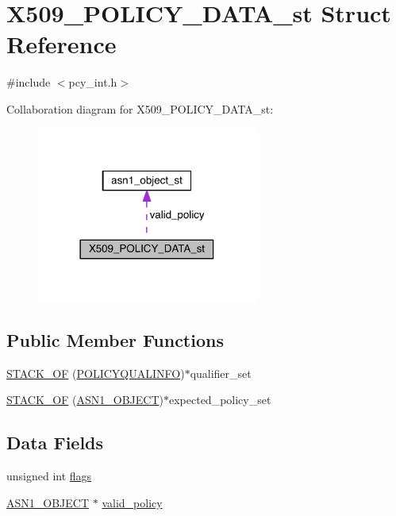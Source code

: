 \hypertarget{struct_x509___p_o_l_i_c_y___d_a_t_a__st}{}\section{X509\+\_\+\+P\+O\+L\+I\+C\+Y\+\_\+\+D\+A\+T\+A\+\_\+st Struct Reference}
\label{struct_x509___p_o_l_i_c_y___d_a_t_a__st}


{\ttfamily \#include $<$pcy\+\_\+int.\+h$>$}



Collaboration diagram for X509\+\_\+\+P\+O\+L\+I\+C\+Y\+\_\+\+D\+A\+T\+A\+\_\+st\+:\nopagebreak
\begin{figure}[H]
\begin{center}
\leavevmode
\includegraphics[width=206pt]{struct_x509___p_o_l_i_c_y___d_a_t_a__st__coll__graph}
\end{center}
\end{figure}
\subsection*{Public Member Functions}
\begin{DoxyCompactItemize}
\item 
\hyperlink{struct_x509___p_o_l_i_c_y___d_a_t_a__st_a58ec43f0c9b94dc50fed2e4c29132810}{S\+T\+A\+C\+K\+\_\+\+OF} (\hyperlink{crypto_2x509v3_2x509v3_8h_a2f82c96293f325f0a4f9899e4c0e8426}{P\+O\+L\+I\+C\+Y\+Q\+U\+A\+L\+I\+N\+FO})$\ast$qualifier\+\_\+set
\item 
\hyperlink{struct_x509___p_o_l_i_c_y___d_a_t_a__st_a8b6e20dfe686b546b146028a0f3c114a}{S\+T\+A\+C\+K\+\_\+\+OF} (\hyperlink{crypto_2ossl__typ_8h_ae3fda0801e4c8e250087052bafb3ce2e}{A\+S\+N1\+\_\+\+O\+B\+J\+E\+CT})$\ast$expected\+\_\+policy\+\_\+set
\end{DoxyCompactItemize}
\subsection*{Data Fields}
\begin{DoxyCompactItemize}
\item 
unsigned int \hyperlink{struct_x509___p_o_l_i_c_y___d_a_t_a__st_ac92588540e8c1d014a08cd8a45462b19}{flags}
\item 
\hyperlink{crypto_2ossl__typ_8h_ae3fda0801e4c8e250087052bafb3ce2e}{A\+S\+N1\+\_\+\+O\+B\+J\+E\+CT} $\ast$ \hyperlink{struct_x509___p_o_l_i_c_y___d_a_t_a__st_af23a5c0eb540eec54880de1c649a064d}{valid\+\_\+policy}
\end{DoxyCompactItemize}


